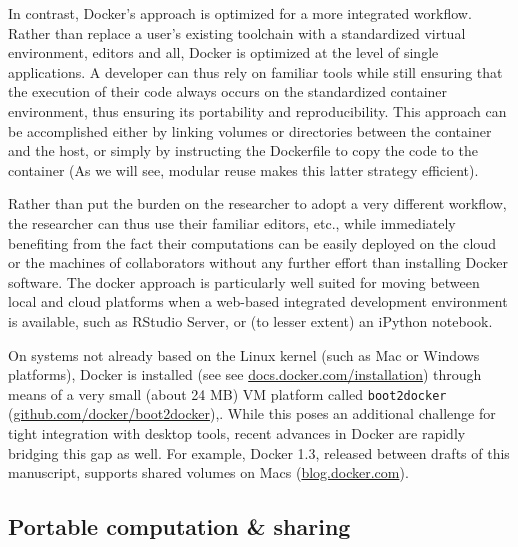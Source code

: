 \documentclass[9pt]{components/acm_proc_article-sp}
\begin{document}
In contrast, Docker's approach is optimized for a more integrated
workflow. Rather than replace a user's existing toolchain with a
standardized virtual environment, editors and all, Docker is optimized
at the level of single applications. A developer can thus rely on
familiar tools while still ensuring that the execution of their code
always occurs on the standardized container environment, thus ensuring
its portability and reproducibility. This approach can be accomplished
either by linking volumes or directories between the container and the
host, or simply by instructing the Dockerfile to copy the code to the
container (As we will see, modular reuse makes this latter strategy
efficient).

Rather than put the burden on the researcher to adopt a very different
workflow, the researcher can thus use their familiar editors, etc.,
while immediately benefiting from the fact their computations can be
easily deployed on the cloud or the machines of collaborators without
any further effort than installing Docker software. The docker approach
is particularly well suited for moving between local and cloud platforms
when a web-based integrated development environment is available, such
as RStudio Server, or (to lesser extent) an iPython notebook.

On systems not already based on the Linux kernel (such as Mac or Windows
platforms), Docker is installed (see see
\href{https://docs.docker.com/installation}{docs.docker.com/installation})
through means of a very small (about 24 MB) VM platform called
\texttt{boot2docker}
(\href{https://github.com/docker/boot2docker}{github.com/docker/boot2docker}),.
While this poses an additional challenge for tight integration with
desktop tools, recent advances in Docker are rapidly bridging this gap
as well. For example, Docker 1.3, released between drafts of this
manuscript, supports shared volumes on Macs
(\href{http://blog.docker.com/2014/10/docker-1-3-signed-images-process-injection-security-options-mac-shared-directories/}{blog.docker.com}).

\subsection{Portable computation \&
sharing}\label{portable-computation-sharing}
\end{document}

